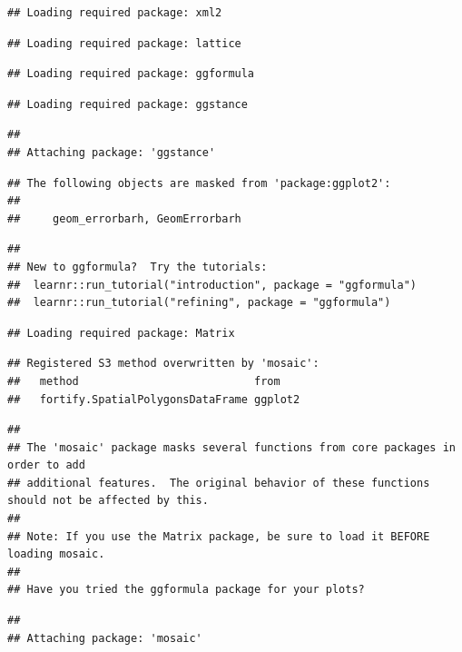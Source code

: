 \documentclass[
]{book}
\begin{document}
\begin{verbatim}
## Loading required package: xml2
\end{verbatim}

\begin{verbatim}
## Loading required package: lattice
\end{verbatim}

\begin{verbatim}
## Loading required package: ggformula
\end{verbatim}

\begin{verbatim}
## Loading required package: ggstance
\end{verbatim}

\begin{verbatim}
## 
## Attaching package: 'ggstance'
\end{verbatim}

\begin{verbatim}
## The following objects are masked from 'package:ggplot2':
## 
##     geom_errorbarh, GeomErrorbarh
\end{verbatim}

\begin{verbatim}
## 
## New to ggformula?  Try the tutorials: 
## 	learnr::run_tutorial("introduction", package = "ggformula")
## 	learnr::run_tutorial("refining", package = "ggformula")
\end{verbatim}

\begin{verbatim}
## Loading required package: Matrix
\end{verbatim}

\begin{verbatim}
## Registered S3 method overwritten by 'mosaic':
##   method                           from   
##   fortify.SpatialPolygonsDataFrame ggplot2
\end{verbatim}

\begin{verbatim}
## 
## The 'mosaic' package masks several functions from core packages in order to add 
## additional features.  The original behavior of these functions should not be affected by this.
## 
## Note: If you use the Matrix package, be sure to load it BEFORE loading mosaic.
## 
## Have you tried the ggformula package for your plots?
\end{verbatim}

\begin{verbatim}
## 
## Attaching package: 'mosaic'
\end{verbatim}
\end{document}
